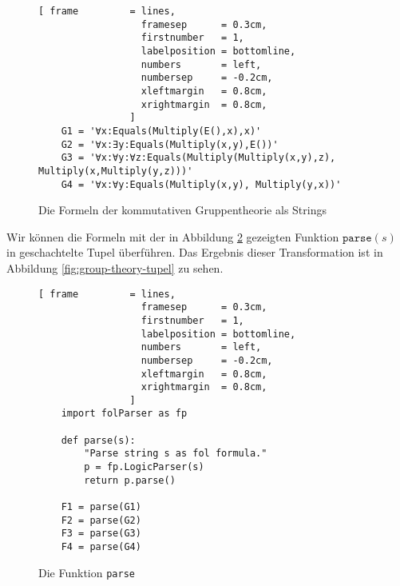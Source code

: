 \begin{figure}[!ht]
\centering
\begin{Verbatim}[ frame         = lines, 
                  framesep      = 0.3cm, 
                  firstnumber   = 1,
                  labelposition = bottomline,
                  numbers       = left,
                  numbersep     = -0.2cm,
                  xleftmargin   = 0.8cm,
                  xrightmargin  = 0.8cm,
                ]
    G1 = '∀x:Equals(Multiply(E(),x),x)'                  
    G2 = '∀x:∃y:Equals(Multiply(x,y),E())'
    G3 = '∀x:∀y:∀z:Equals(Multiply(Multiply(x,y),z), Multiply(x,Multiply(y,z)))'
    G4 = '∀x:∀y:Equals(Multiply(x,y), Multiply(y,x))'
\end{Verbatim}
\vspace*{-0.3cm}
\caption{Die Formeln der kommutativen Gruppentheorie als Strings}
\label{fig:group-theory}
\end{figure}

Wir können die Formeln mit der in Abbildung \ref{fig:fol-parse.py} gezeigten Funktion $\texttt{parse}(s)$ in
geschachtelte Tupel überführen.  Das Ergebnis dieser Transformation ist in Abbildung
\ref{fig:group-theory-tupel} zu sehen.


\begin{figure}[!ht]
\centering
\begin{Verbatim}[ frame         = lines, 
                  framesep      = 0.3cm, 
                  firstnumber   = 1,
                  labelposition = bottomline,
                  numbers       = left,
                  numbersep     = -0.2cm,
                  xleftmargin   = 0.8cm,
                  xrightmargin  = 0.8cm,
                ]
    import folParser as fp
    
    def parse(s):
        "Parse string s as fol formula."
        p = fp.LogicParser(s)
        return p.parse()

    F1 = parse(G1)
    F2 = parse(G2)
    F3 = parse(G3)
    F4 = parse(G4)
\end{Verbatim}
\vspace*{-0.3cm}
\caption{Die Funktion \texttt{parse}}
\label{fig:fol-parse.py}
\end{figure}

